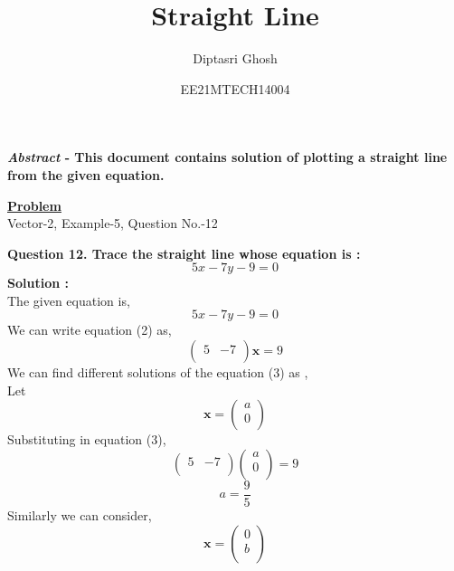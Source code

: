 \documentclass[twocolumn]{article}
\title{Straight Line}
\author{Diptasri Ghosh}
\date{EE21MTECH14004}
\begin{document}
\maketitle
\textbf{\textit{Abstract} - This document contains solution of plotting a straight line from the given equation.}\\
\begin{center}
\textbf{\ul{Problem}}\\
Vector-2, Example-5, Question No.-12
\end{center}

\textbf{Question 12. Trace the straight line whose equation is :}\\
\begin{equation}
5x - 7y -9 = 0
\end{equation}
\textbf{Solution :}\\
The given equation is,
\begin{equation}
5x - 7y -9 = 0
\end{equation}
We can write equation (2) as,
\begin{equation}
\begin{pmatrix}
5 & -7\\ 
\end{pmatrix} \textbf{x} = 9
\end{equation}
We can find different solutions of the equation (3) as , \\
Let 
\begin{equation}
\textbf{x} = \begin{pmatrix}
a \\ 
0\\
\end{pmatrix}
\end{equation}
Substituting in equation (3),
\begin{equation}
\begin{pmatrix}
5 & -7 \\ 
\end{pmatrix}\begin{pmatrix}
a\\ 
0\\
\end{pmatrix} = 9
\end{equation}
\begin{equation}
a = \frac{9}{5}
\end{equation}
Similarly we can consider,
\begin{equation}
\textbf{x} = \begin{pmatrix}
0\\ 
b\\
\end{pmatrix}
\end{equation}
\end{document}
